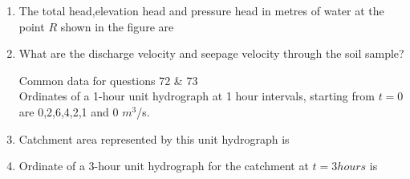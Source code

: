 \documentclass[journal]{IEEEtran}
\begin{document}
\begin {enumerate}[start=70]
\item %
The total head,elevation head and pressure head in metres of water at the point $R$ shown in the figure are
\begin{enumerate}
\end{enumerate}
\item %
What are the discharge velocity and seepage velocity through the soil sample?
\begin{enumerate}
\end{enumerate}
Common data for questions 72 \& 73 \\
Ordinates of a 1-hour unit hydrograph at 1 hour intervals, starting from $t=0$ are 0,2,6,4,2,1 and 0 $m^3$/s.
\item %
Catchment area represented by this unit hydrograph is 
\begin{enumerate}
\end{enumerate}
\item %
Ordinate of a 3-hour unit hydrograph for the catchment at $t=3 hours$ is 
\begin{enumerate}
\end{enumerate}
\end{enumerate}
\end{document}
